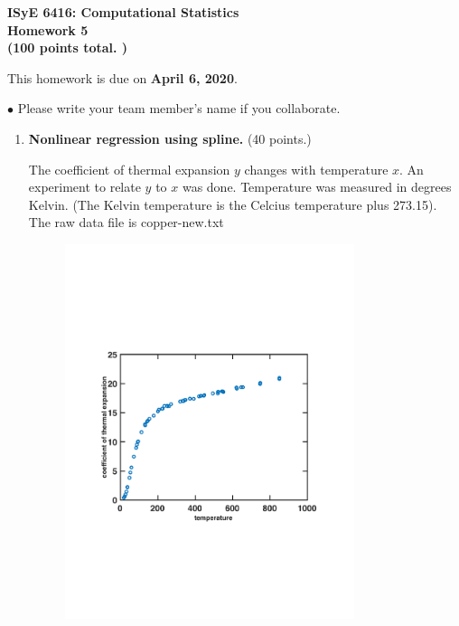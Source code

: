\documentclass[11pt]{article}
\begin{document}
\begin{center}
{\bf ISyE 6416: Computational Statistics}\\
{\bf Homework 5 \\ (100 points total. )}
\end{center}


\vspace{.2in} \noindent This homework is due on {\bf April 6, 2020}. 

\vspace{.05in} \noindent $\bullet$ Please write your team member's name if you collaborate.

\vspace{.20in}

\begin{enumerate}







\item {\bf Nonlinear regression using spline.} (40 points.)

The coefficient of thermal expansion $y$ changes with temperature $x$. An experiment to relate $y$ to $x$ was done. Temperature was measured in degrees Kelvin. (The Kelvin temperature is the Celcius temperature plus 273.15). The raw data file is \textsf{copper-new.txt} 

\begin{figure}[h!]
\begin{center}
\includegraphics[width = 0.8\textwidth]{t_c}
\end{center}
\end{figure}


\end{enumerate}
\end{document}
